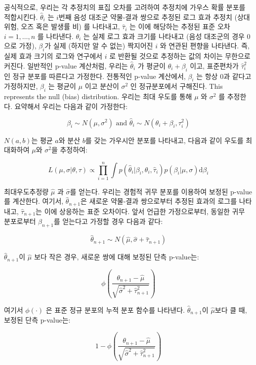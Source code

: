 \documentclass[11pt]{book}
\theoremstyle{definition}
\theoremstyle{definition}
\theoremstyle{definition}
\theoremstyle{remark}
\begin{document}
공식적으로, 우리는 각 추정치의 표집 오차를 고려하여 추정치에 가우스 확률
분포를 적합시킨다. \(\hat{\theta}_i\) 는 \(i\)번째 음성 대조군 약물-결과
쌍으로 추정된 로그 효과 추정치 (상대 위험, 오즈 혹은 발생률 비) 를
나타내고, \(\hat{\tau}_i\) 는 이에 해당하는 추정된 표준 오차
\(i=1,\ldots,n\) 를 나타낸다. \(\theta_i\) 는 실제 로그 효과 크기를
나타내고 (음성 대조군의 경우 0으로 가정), \(\beta_i\)가 실제 (하지만 알
수 없는) 짝지어진 \(i\) 와 연관된 편향을 나타낸다. 즉, 실제 효과 크기의
로그와 연구에서 \(i\) 로 반환될 것으로 추정하는 값의 차이는 무한으로
커진다. 일반적인 p-value 계산처럼, 우리는 \(\hat{\theta}_i\) 가 평균이
\(\theta_i + \beta_i\) 이고, 표준편차가 \(\hat{\tau}_i^2\) 인 정규
분포를 따른다고 가정한다. 전통적인 p-value 계산에서, \(\beta_i\) 는 항상
0과 같다고 가정하지만, \(\beta_i\) 는 평균이 \(\mu\) 이고 분산이
\(\sigma^2\) 인 정규분포에서 구해진다. This represents the null (bias)
distribution. 우리는 최대 우도를 통해 \(\mu\) 와 \(\sigma^2\) 를
추정한다. 요약해서 우리는 다음과 같이 가정한다:

\[\beta_i \sim N(\mu,\sigma^2) \text{  and  } \hat{\theta}_i \sim N(\theta_i + \beta_i, \tau_i^2)\]

\(N(a,b)\)는 평균 \(a\)와 분산 \(b\)를 갖는 가우시안 분포를 나타내고,
다음과 같이 우도를 최대화하여 \(\mu\)와 \(\sigma^2\)을 추정하여:

\[L(\mu, \sigma | \theta, \tau) \propto \prod_{i=1}^{n}\int p(\hat{\theta}_i|\beta_i, \theta_i, \hat{\tau}_i)p(\beta_i|\mu, \sigma) \text{d}\beta_i\]

최대우도추정량 \(\hat{\mu}\) 과 \(\hat{\sigma}\)를 얻는다. 우리는 경험적
귀무 분포를 이용하여 보정된 p-value를 계산한다. 여기서,
\(\hat{\theta}_{n+1}\)은 새로운 약물-결과 쌍으로부터 추정된 효과의
로그를 나타내고, \(\hat{\tau}_{n+1}\)는 이에 상응하는 표준 오차이다.
앞서 언급한 가정으로부터, 동일한 귀무 분포로부터 \(\beta_{n+1}\)를
얻는다고 가정할 경우 다음과 같다:

\[\hat{\theta}_{n+1} \sim N(\hat{\mu}, \hat{\sigma} + \hat{\tau}_{n+1})\]

\(\hat{\theta}_{n+1}\)이 \(\hat{\mu}\) 보다 작은 경우, 새로운 쌍에 대해
보정된 단측 p-value는:

\[\phi\left(\frac{\theta_{n+1} - \hat{\mu}}{\sqrt{\hat{\sigma}^2 + \hat{\tau}_{n+1}^2}}\right)\]

여기서 \(\phi(\cdot)\) 은 표준 정규 분포의 누적 분포 함수를 나타낸다.
\(\hat{\theta}_{n+1}\)이 \(\hat{\mu}\)보다 클 때, 보정된 단측 p-value는:

\[1-\phi\left(\frac{\theta_{n+1} - \hat{\mu}}{\sqrt{\hat{\sigma}^2 + \hat{\tau}_{n+1}^2}}\right)\]
\end{document}
